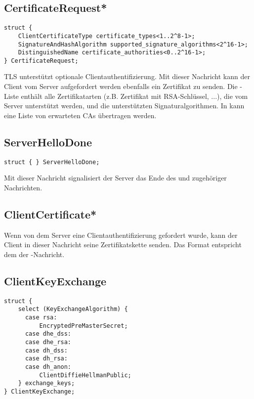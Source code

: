 \subsection{CertificateRequest*}

\begin{lstlisting}
struct {
	ClientCertificateType certificate_types<1..2^8-1>;
	SignatureAndHashAlgorithm supported_signature_algorithms<2^16-1>;
	DistinguishedName certificate_authorities<0..2^16-1>;
} CertificateRequest;
\end{lstlisting}

TLS unterstützt optionale Clientauthentifizierung. Mit dieser Nachricht kann der Client vom Server aufgefordert werden ebenfalls ein Zertifikat zu senden. Die -Liste enthält alle Zertifikatarten (z.B. Zertifikat mit RSA-Schlüssel, ...), die vom Server unterstützt werden, und  die unterstützten Signaturalgorithmen. In  kann eine Liste von erwarteten CAs übertragen werden.

\subsection{ServerHelloDone}

\begin{lstlisting}
struct { } ServerHelloDone;
\end{lstlisting}

Mit dieser Nachricht signalisiert der Server das Ende des \serverhello{} und zugehöriger Nachrichten.

\subsection{ClientCertificate*}

Wenn von dem Server eine Clientauthentifizierung gefordert wurde, kann der Client in dieser Nachricht seine Zertifikatskette senden. Das Format entspricht dem der \servercertificate{}-Nachricht.

\subsection{ClientKeyExchange}

\begin{lstlisting}
struct {
	select (KeyExchangeAlgorithm) {
	  case rsa:
	      EncryptedPreMasterSecret;
	  case dhe_dss:
	  case dhe_rsa:
	  case dh_dss:
	  case dh_rsa:
	  case dh_anon:
	      ClientDiffieHellmanPublic;
	} exchange_keys;
} ClientKeyExchange;
\end{lstlisting}

